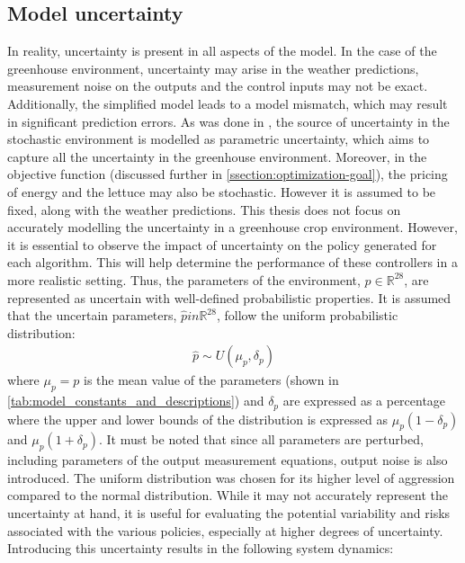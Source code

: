 \subsection{Model uncertainty}
In reality, uncertainty is present in all aspects of the model. In the case of the greenhouse environment, uncertainty may arise in the weather predictions, measurement noise on the outputs and the control inputs may not be exact. Additionally, the simplified model leads to a model mismatch, which may result in significant prediction errors.  As was done in \cite{boersmaRobustSamplebasedModel2022, lubbersAutonomousGreenhouseClimate2023}, the source of uncertainty in the stochastic environment is modelled as parametric uncertainty, which aims to capture all the uncertainty in the greenhouse environment. Moreover, in the objective function (discussed further in \autoref{ssection:optimization-goal}), the pricing of energy and the lettuce may also be stochastic. However it is assumed to be fixed, along with the weather predictions.
This thesis does not focus on accurately modelling the uncertainty in a greenhouse crop environment. However, it is essential to observe the impact of uncertainty on the policy generated for each algorithm. This will help determine the performance of these controllers in a more realistic setting. Thus, the parameters of the environment, $p \in \mathbb{R}^{28}$, are represented as uncertain with well-defined probabilistic properties. It is assumed that the uncertain parameters, $\hat{p} in \mathbb{R}^{28}$, follow the uniform probabilistic distribution:
\begin{equation}
	\label{eq:uncertainty_model}
	\begin{aligned}
		\hat{p} \sim U(\mu_p, \delta_p)  
	\end{aligned}
\end{equation}
where $\mu_p = p$ is the mean value of the parameters  (shown in \autoref{tab:model_constants_and_descriptions}) and $\delta_p$ are expressed as a percentage where the upper and lower bounds of the distribution is expressed as $\mu_p(1-\delta_p)$ and $\mu_p(1+\delta_p)$. It must be noted that since all parameters are perturbed, including parameters of the output measurement equations, output noise is also introduced. The uniform distribution was chosen for its higher level of aggression compared to the normal distribution. While it may not accurately represent the uncertainty at hand, it is  useful for evaluating the potential variability and risks associated with the various policies, especially at higher degrees of uncertainty. Introducing this uncertainty results in the following system dynamics:


